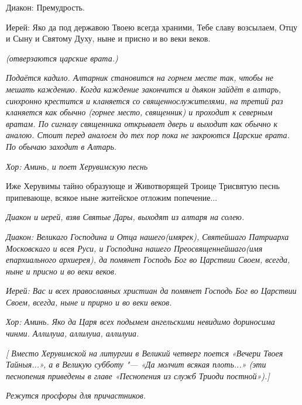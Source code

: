   Диакон:\normalfont{} Премудрость. \itshape 


  Иерей:\normalfont{} Яко да под державою Твоею всегда храними, Тебе славу возсылаем, Отцу и Сыну и Святому Духу, ныне и присно и во веки веков. 


 \itshape (отверзаются царские врата.)\normalfont{}


 \itshape Подаётся кадило. Алтарник становится на горнем месте так, чтобы не мешать каждению. Когда каждение закончится и дьякон зайдёт в алтарь, синхронно крестится и кланяется со священнослужителями, на третий раз кланяется как обычно (горнее место, священник) и проходит к северным вратам. По сигналу священника открывает дверь и выходит как обычно к аналою. Стоит перед аналоем до тех пор пока не закроются Царские врата. По обычаю заходит в Алтарь\normalfont{}. 


\itshape  Хор:\normalfont{} Аминь, \itshape и поет Херувимскую песнь \normalfont{}




  Иже Херувимы тайно образующе и Животворящей Троице Трисвятую песнь припевающе, всякое ныне житейское отложим попечение... 




\itshape  Диакон и иерей, взяв Святые Дары, выходят из алтаря на солею.\normalfont{}


\itshape  Диакон:\normalfont{} Великаго Господина и Отца нашего\itshape  (имярек),\normalfont{} Святейшаго Патриарха Московскаго и всея Руси, и Господина нашего Преосвященнейшаго\itshape  (имя епархиального архиерея),\normalfont{} да помянет Господь Бог во Царствии Своем, всегда, ныне и присно и во веки веков.


\itshape  Иерей:\normalfont{} Вас и всех православных христиан да помянет Господь Бог во Царствии Своем, всегда, ныне и прирно и во веки веков.


\itshape Хор:\normalfont{} Аминь. Яко да Царя всех подымем ангельскими невидимо дориносима чинми. Аллилуиа, аллилуиа, аллилуиа.


 \itshape  [ Вместо Херувимской на литургии в Великий четверг поется \normalfont{}«Вечери Твоея Тайныя..\itshape .», а в Великую субботу "--- \normalfont{}«Да молчит всякая плоть..\itshape .» (эти песнопения приведены в главе «Песнопения из служб Триоди постной»).]\normalfont{}



\itshape  Режутся просфоры для причастников\normalfont{}. 


